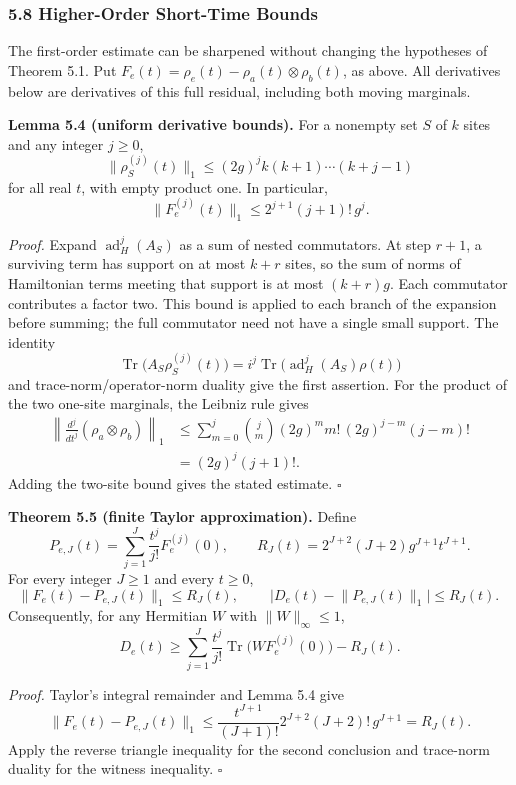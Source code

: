 \documentclass[
  11pt,
]{article}
\begin{document}
\subsubsection{5.8 Higher-Order Short-Time Bounds}\label{higher-order-short-time-bounds}

The first-order estimate can be sharpened without changing the hypotheses of
Theorem 5.1. Put \(F_e(t)=\rho_e(t)-\rho_a(t)\otimes\rho_b(t)\), as above.
All derivatives below are derivatives of this full residual, including both
moving marginals.

\textbf{Lemma 5.4 (uniform derivative bounds).} For a nonempty set \(S\) of \(k\)
sites and any integer \(j\geq0\),
\[
 \lVert \rho_S^{(j)}(t)\rVert_1
 \leq (2g)^j k(k+1)\cdots(k+j-1)
\]
for all real \(t\), with empty product one. In particular,
\[
 \boxed{\ \lVert F_e^{(j)}(t)\rVert_1\leq 2^{j+1}(j+1)!\,g^j.\ }
\]

\emph{Proof.} Expand \(\operatorname{ad}_H^j(A_S)\) as a sum of nested
commutators. At step \(r+1\), a surviving term has support on at most
\(k+r\) sites, so the sum of norms of Hamiltonian terms meeting that
support is at most \((k+r)g\). Each commutator contributes a factor two.
This bound is applied to each branch of the expansion before summing;
the full commutator need not have a single small support. The identity
\[
 \operatorname{Tr}\bigl(A_S\rho_S^{(j)}(t)\bigr)
 =i^j\operatorname{Tr}\bigl(\operatorname{ad}_H^j(A_S)\rho(t)\bigr)
\]
and trace-norm/operator-norm duality give the first assertion.
For the product of the two one-site marginals, the Leibniz rule gives
\[
 \begin{aligned}
 \left\lVert\frac{d^j}{dt^j}(\rho_a\otimes\rho_b)\right\rVert_1
 &\leq\sum_{m=0}^j {j\choose m}
       (2g)^m m!\,(2g)^{j-m}(j-m)!\\
 &=(2g)^j(j+1)!.
 \end{aligned}
\]
Adding the two-site bound gives the stated estimate. \(\square\)

\textbf{Theorem 5.5 (finite Taylor approximation).} Define
\[
 P_{e,J}(t)=\sum_{j=1}^{J}\frac{t^j}{j!}F_e^{(j)}(0),
 \qquad
 R_J(t)=2^{J+2}(J+2)g^{J+1}t^{J+1}.
\]
For every integer \(J\geq1\) and every \(t\geq0\),
\[
 \lVert F_e(t)-P_{e,J}(t)\rVert_1\leq R_J(t),\qquad
 \boxed{\ \bigl|D_e(t)-\lVert P_{e,J}(t)\rVert_1\bigr|\leq R_J(t).\ }
\]
Consequently, for any Hermitian \(W\) with \(\lVert W\rVert_\infty\leq1\),
\[
 D_e(t)\geq
 \sum_{j=1}^{J}\frac{t^j}{j!}\operatorname{Tr}
       \bigl(WF_e^{(j)}(0)\bigr)-R_J(t).
\]

\emph{Proof.} Taylor's integral remainder and Lemma 5.4 give
\[
 \lVert F_e(t)-P_{e,J}(t)\rVert_1
 \leq\frac{t^{J+1}}{(J+1)!}
       2^{J+2}(J+2)!\,g^{J+1}=R_J(t).
\]
Apply the reverse triangle inequality for the second conclusion and
trace-norm duality for the witness inequality. \(\square\)
\end{document}
